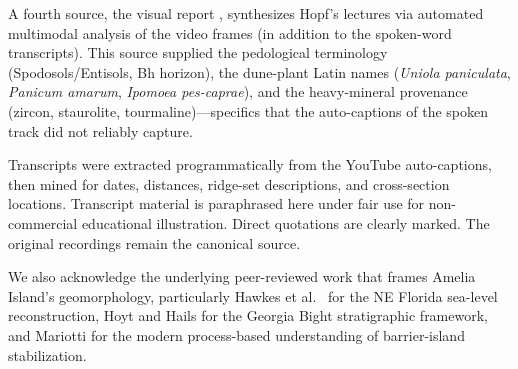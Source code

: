 \documentclass[11pt]{article}
\begin{document}
\noindent A fourth source, the visual report \cite{cn_hopf_videoreport},
synthesizes Hopf's lectures via automated multimodal analysis of the
video frames (in addition to the spoken-word transcripts). This source
supplied the pedological terminology (Spodosols/Entisols, Bh horizon),
the dune-plant Latin names (\emph{Uniola paniculata},
\emph{Panicum amarum}, \emph{Ipomoea pes-caprae}), and the heavy-mineral
provenance (zircon, staurolite, tourmaline)---specifics that the
auto-captions of the spoken track did not reliably capture.

\noindent Transcripts were extracted programmatically from the YouTube
auto-captions, then mined for dates, distances, ridge-set descriptions, and
cross-section locations. Transcript material is paraphrased here under fair
use for non-commercial educational illustration. Direct quotations are
clearly marked. The original recordings remain the canonical source.

We also acknowledge the underlying peer-reviewed work that frames Amelia
Island's geomorphology, particularly Hawkes et al.\ \cite{hawkes2016} for the
NE Florida sea-level reconstruction, Hoyt and Hails \cite{hoyt1967} for the
Georgia Bight stratigraphic framework, and Mariotti \cite{mariotti2021} for
the modern process-based understanding of barrier-island stabilization.
\end{document}
